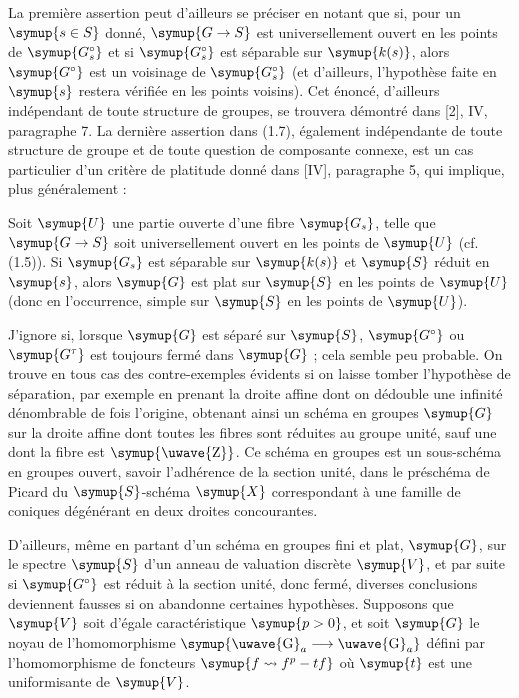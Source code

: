 La première assertion peut d'ailleurs se préciser en notant que si, pour un
$\symup{s\in S}$ donné, $\symup{G\to S}$ est universellement ouvert en les points
de $\symup{G_s^\circ}$ et si $\symup{G_s^\circ}$ est séparable sur $\symup{k(s)}$, alors $\symup{G^\circ}$ est
un voisinage de $\symup{G_s^\circ}$ (et d'ailleurs, l'hypothèse faite en $\symup{s}$ restera
vérifiée en les points voisins). Cet énoncé, d'ailleurs indépendant de toute
structure de groupes, se trouvera démontré dans [2], IV, paragraphe 7. La
dernière assertion dans (1.7), également indépendante de toute structure de
groupe et de toute question de composante {connexe}, est un cas particulier d'un
critère de platitude donné dans [IV], paragraphe 5, qui implique, plus
généralement :

 Soit $\symup{U}$ une partie ouverte d'une fibre $\symup{G_s}$, telle
que $\symup{G\to S}$ soit universellement ouvert en les points de $\symup{U}$ (cf.
(1.5)). Si $\symup{G_s}$ est séparable sur $\symup{k(s)}$ et $\symup{S}$ réduit en $\symup{s}$, alors $\symup{G}$ est
plat sur $\symup{S}$ en les points de $\symup{U}$ (donc en l'occurrence, simple sur $\symup{S}$ en les
points de $\symup{U}$).

 J'ignore si, lorsque $\symup{G}$ est séparé sur $\symup{S}$, $\symup{G^\circ}$
ou $\symup{G^\tau}$ est toujours fermé dans $\symup{G}$ ; cela semble peu probable. On trouve
en tous cas des contre-exemples évidents si on laisse tomber l'hypothèse de
séparation, par exemple en prenant la droite affine dont on dédouble une
infinité dénombrable de fois l'origine, obtenant ainsi un schéma en groupes $\symup{G}$
sur la droite affine dont toutes les fibres sont réduites au groupe unité, sauf
une dont la fibre est $\symup{\text{\uwave{Z}}}$. Ce schéma en groupes est un sous-schéma en
groupes ouvert, savoir l'adhérence de la section unité, dans le préschéma de
Picard du $\symup{S}$-schéma $\symup{X}$ correspondant à une famille de coniques dégénérant en
deux droites concourantes.

D'ailleurs, même en partant d'un schéma en groupes fini et plat, $\symup{G}$, sur le
spectre $\symup{S}$ d'un anneau de valuation discrète $\symup{V}$, et par suite si $\symup{G^\circ}$
est réduit à la section unité, donc fermé, diverses conclusions deviennent
fausses si on abandonne certaines hypothèses. Supposons que $\symup{V}$ soit d'égale
caractéristique $\symup{p>0}$, et soit $\symup{G}$ le noyau de l'homomorphisme
$\symup{\text{\uwave{G}}_a\longrightarrow\text{\uwave{G}}_a}$ défini par l'homomorphisme de
foncteurs $\symup{f\rightsquigarrow f^p-tf}$ où $\symup{t}$ est une uniformisante de $\symup{V}$.

